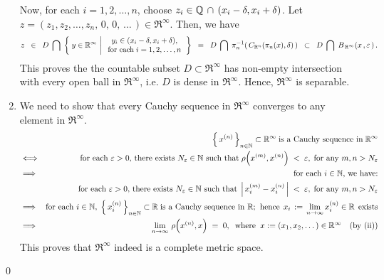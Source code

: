 \begin{enumerate}
\begin{equation*}
	\end{equation*}
	Now, for each $i = 1, 2, \ldots, n$, choose $z_{i} \in \Q\,\cap\,(x_{i}-\delta,x_{i}+\delta)$.
	Let $z = (z_{1},z_{2},\ldots,z_{n},\,0,\,0,\,\ldots\,) \in \Re^{\infty}$.
	Then, we have
	\begin{equation*}
	z \;\; \in \;\;
	D\;\bigcap\;
	\left\{\;
	y \in \Re^{\infty}
	\,\left\vert\;
	\begin{array}{c} y_{i} \in (x_{i}-\delta,x_{i}+\delta),\\ \textnormal{for each}\;i = 1, 2, \ldots, n\end{array}
	\right.
	\right\}
	\;\; = \;\;
	D\;\bigcap\;
	\pi_{n}^{-1}\!\left(\,C_{\Re^{n}}(\pi_{n}(x),\delta)\,\right)
	\;\; \subset \;\;
	D \;\bigcap\; B_{\mbox{}\,\Re^{\infty}}\!\left(x\,,\varepsilon\,\right).
	\end{equation*}
	This proves the the countable subset $D \subset \Re^{\infty}$ has non-empty intersection with every open
	ball in $\Re^{\infty}$, i.e. $D$ is dense in $\Re^{\infty}$. Hence, $\Re^{\infty}$ is separable.
\item
	We need to show that every Cauchy sequence in $\Re^{\infty}$ converges to any element in $\Re^{\infty}$.
	\begin{eqnarray*}
	&& \left\{\,x^{(n)}\,\right\}_{n\in\N} \subset \Re^{\infty}\;\textnormal{is a Cauchy sequence in}\;\Re^{\infty}
	\\
	&\Longleftrightarrow& \textnormal{for each $\varepsilon > 0$, there exists $N_{\varepsilon} \in \N$ such that}
		\;\rho\!\left(x^{(m)},x^{(n)}\right) \; < \; \varepsilon,\;\textnormal{for any $m, n > N_{\varepsilon}$}
	\\
	&\Longrightarrow& \textnormal{for each $i \in \N$, we have:}
	\\
	&&
		\textnormal{for each $\varepsilon > 0$, there exists $N_{\varepsilon} \in \N$ such that}
		\;\left\vert\,x^{(m)}_{i} - x^{(n)}_{i}\,\right\vert \; < \; \varepsilon,\;\textnormal{for any $m, n > N_{\varepsilon}$}
	\\
	&\Longrightarrow&
		\textnormal{for each $i \in \N$},\;\left\{\,x^{(n)}_{i}\,\right\}_{n\in\N}\subset\Re
		\;\textnormal{is a Cauchy sequence in $\Re$;\;\;hence}\;\,
		x_{i}\,:=\,\lim_{n\rightarrow\infty}x^{(n)}_{i} \in \Re\;\,\textnormal{exists}
	\\
	&\Longrightarrow&
		\lim_{n\rightarrow\infty}\,\rho\!\left(x^{(n)},x\right) \;=\; 0,
		\;\;\textnormal{where}\;\; x := (x_{1},x_{2},\ldots\,) \in \Re^{\infty}
		\quad\textnormal{(by (ii))}
	\end{eqnarray*}
	This proves that $\Re^{\infty}$ indeed is a complete metric space.
\end{enumerate}
\qed

